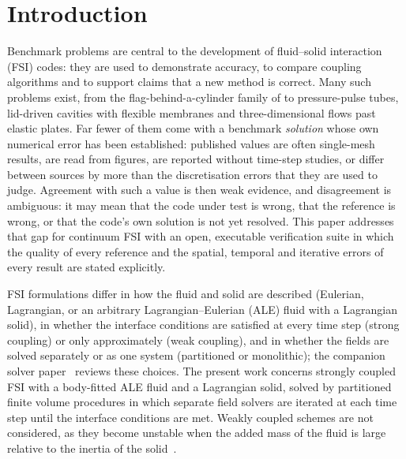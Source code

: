 \section{Introduction}\label{sec:intro}
Benchmark problems are central to the development of fluid--solid interaction (FSI) codes: they are used to demonstrate accuracy, to compare coupling algorithms and to support claims that a new method is correct.
Many such problems exist, from the flag-behind-a-cylinder family of \citet{Turek2006} to pressure-pulse tubes, lid-driven cavities with flexible membranes and three-dimensional flows past elastic plates.
Far fewer of them come with a benchmark \emph{solution} whose own numerical error has been established: published values are often single-mesh results, are read from figures, are reported without time-step studies, or differ between sources by more than the discretisation errors that they are used to judge.
Agreement with such a value is then weak evidence, and disagreement is ambiguous: it may mean that the code under test is wrong, that the reference is wrong, or that the code's own solution is not yet resolved.
This paper addresses that gap for continuum FSI with an open, executable verification suite in which the quality of every reference and the spatial, temporal and iterative errors of every result are stated explicitly.

FSI formulations differ in how the fluid and solid are described (Eulerian, Lagrangian, or an arbitrary Lagrangian--Eulerian (ALE) fluid with a Lagrangian solid), in whether the interface conditions are satisfied at every time step (strong coupling) or only approximately (weak coupling), and in whether the fields are solved separately or as one system (partitioned or monolithic); the companion solver paper~\citep{CardiffBatistic2026QM} reviews these choices.
The present work concerns strongly coupled FSI with a body-fitted ALE fluid and a Lagrangian solid, solved by partitioned finite volume procedures in which separate field solvers are iterated at each time step until the interface conditions are met.
Weakly coupled schemes are not considered, as they become unstable when the added mass of the fluid is large relative to the inertia of the solid~\citep{Causin2005, Forster2006}.

